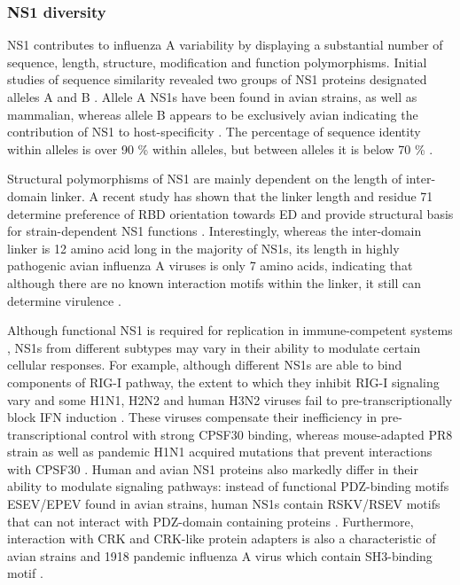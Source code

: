 		
		
		\subsubsection{NS1 diversity}
		
		NS1 contributes to influenza A variability by displaying a substantial number of sequence, length, structure, modification and function polymorphisms. Initial studies of sequence similarity revealed two groups of \gls{NS1} proteins designated alleles A and B \parencite{Scholtissek1980}. Allele A \gls{NS1}s have been found in avian strains, as well as mammalian, whereas allele B appears to be exclusively avian indicating the contribution of NS1 to host-specificity \parencite{Treanor1989, Ludwig1991}. The percentage of sequence identity within alleles is over 90 \% within alleles, but between alleles it is below 70 \% \parencite{Scholtissek1980}.
		
		Structural polymorphisms of \gls{NS1} are mainly dependent on the length of inter-domain linker. A recent study has shown that the linker length and residue 71 determine preference of \gls{RBD} orientation towards \gls{ED} and provide structural basis for strain-dependent \gls{NS1} functions \parencite{Carrillo2014}. Interestingly, whereas the inter-domain linker is 12 amino acid long in the majority of \gls{NS1}s, its length in highly pathogenic avian influenza A viruses is only 7 amino acids, indicating that although there are no known interaction motifs within the linker, it still can determine virulence \parencite{Long2008}.
		
		Although functional \gls{NS1} is required for replication in immune-competent systems \parencite{Garcia-Sastre1998, Donelan2003}, \gls{NS1}s from different subtypes may vary in their ability to modulate certain cellular responses. For example, although different \gls{NS1}s are able to bind components of \gls{RIG-I} pathway, the extent to which they inhibit \gls{RIG-I} signaling vary and some H1N1, H2N2 and human H3N2 viruses fail to pre-transcriptionally block \gls{IFN} induction \parencite{Kochs2007, Haye2009, Munir2011a, Munir2012}. These viruses compensate their inefficiency in pre-transcriptional control with strong \gls{CPSF}30 binding, whereas mouse-adapted PR8 strain as well as pandemic H1N1 acquired mutations that prevent interactions with \gls{CPSF}30 \parencite{Kochs2007, Hale2010d}. Human and avian \gls{NS1} proteins also markedly differ in their ability to modulate signaling pathways: instead of functional PDZ-binding motifs ESEV/EPEV found in avian strains, human NS1s contain RSKV/RSEV motifs that can not interact with PDZ-domain containing proteins \parencite{Liu2010}. Furthermore, interaction with CRK and CRK-like protein adapters is also a characteristic of avian strains and 1918 pandemic influenza A virus which contain SH3-binding motif \parencite{Heikkinen2008}.
		
